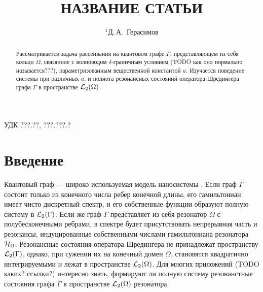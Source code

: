 \documentclass{nsart_eng}
\begin{document}
\title[короткое название статьи]
{НАЗВАНИЕ СТАТЬИ}

\author[Д.\,А.~Герасимов]
{$^1$Д.\,А.~Герасимов}

\address{
$^1$ Санкт-Петербургский Национальный Исследовательский Университет Информационных Технологий, \\
Механики и Оптики,\\
Кронверкский пр., 49, Санкт-Петербург, 197101, Россия}


УДК ???.??, ???.???.?%

\begin{abstract}
Рассматривается задача рассеивания на квантовом графе $\Gamma$, представляющем из себя кольцо $\Omega$, связянное с волноводом $\delta$-граничным условием (TODO как оно нормально называется???), параметризованным вещественной константой $a$. Изучается поведение системы при различных $a$, и полнота резонансных состояний оператора Шредингера графа $\Gamma$ в пространстве $\mathcal{L}_2(\Omega)$.
\end{abstract}


\maketitle

\section{Введение}

Квантовый граф — широко используемая модель наносистемы \cite{1, 2, 3, 4}. Если граф $\Gamma$ состоит только из конечного числа ребер конечной длины, его гамильтониан имеет чисто дискретный спектр, и его собственные функции образуют полную систему в $\mathcal{L}_2(\Gamma)$. Если же граф $\Gamma$ представляет из себя резонатор $\Omega$ с полубесконечными ребрами, в спектре будет присутствовать непрерывная часть и резонансы, индуцированные собственными числами гамильтониана резонатора $\mathcal{H}_\Omega$. Резонансные состояния оператора Шредингера не принадлежат пространству $\mathcal{L}_2(\Gamma)$, однако, при сужении их на конечный домен $\Omega$, становятся квадратично интегрируемыми и лежат в пространстве $\mathcal{L}_2(\Omega)$. Для многих приложений (TODO каких? ссылки?) интересно знать, формируют ли полную систему резонанстные состояния графа $\Gamma$ в пространстве $\mathcal{L}_2(\Omega)$ резонатора.
\end{document}
